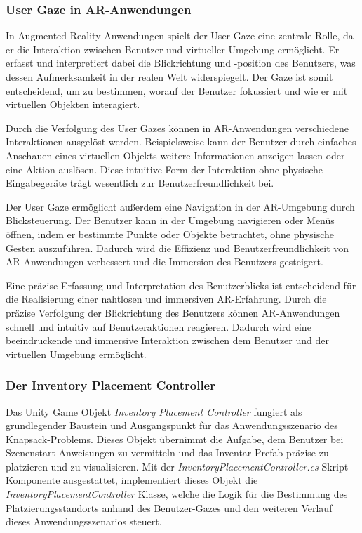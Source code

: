 \subsubsection{User Gaze in AR-Anwendungen}
In Augmented-Reality-Anwendungen spielt der User-Gaze eine zentrale Rolle, da er die Interaktion zwischen Benutzer und
virtueller Umgebung ermöglicht. Er erfasst und interpretiert dabei die Blickrichtung und -position des Benutzers, was dessen
Aufmerksamkeit in der realen Welt widerspiegelt. Der Gaze ist somit entscheidend, um zu bestimmen, worauf der Benutzer
fokussiert und wie er mit virtuellen Objekten interagiert.

Durch die Verfolgung des User Gazes können in AR-Anwendungen verschiedene Interaktionen ausgelöst werden. Beispielsweise
kann der Benutzer durch einfaches Anschauen eines virtuellen Objekts weitere Informationen anzeigen lassen oder eine Aktion
auslösen. Diese intuitive Form der Interaktion ohne physische Eingabegeräte trägt wesentlich zur Benutzerfreundlichkeit bei.

Der User Gaze ermöglicht außerdem eine Navigation in der AR-Umgebung durch Blicksteuerung. Der Benutzer kann in der Umgebung
navigieren oder Menüs öffnen, indem er bestimmte Punkte oder Objekte betrachtet, ohne physische Gesten auszuführen. Dadurch
wird die Effizienz und Benutzerfreundlichkeit von AR-Anwendungen verbessert und die Immersion des Benutzers gesteigert.

Eine präzise Erfassung und Interpretation des Benutzerblicks ist entscheidend für die Realisierung einer nahtlosen und
immersiven AR-Erfahrung. Durch die präzise Verfolgung der Blickrichtung des Benutzers können AR-Anwendungen schnell und
intuitiv auf Benutzeraktionen reagieren. Dadurch wird eine beeindruckende und immersive Interaktion zwischen dem Benutzer
und der virtuellen Umgebung ermöglicht.

\subsubsection{Der Inventory Placement Controller}
Das Unity Game Objekt \textit{Inventory Placement Controller} fungiert als grundlegender Baustein und Ausgangspunkt für
das Anwendungsszenario des Knapsack-Problems. Dieses Objekt übernimmt die Aufgabe, dem Benutzer bei Szenenstart Anweisungen
zu vermitteln und das Inventar-Prefab präzise zu platzieren und zu visualisieren. Mit der \textit{InventoryPlacementController.cs}
Skript-Komponente ausgestattet, implementiert dieses Objekt die \textit{InventoryPlacementController} Klasse, welche die
Logik für die Bestimmung des Platzierungsstandorts anhand des Benutzer-Gazes und den weiteren Verlauf dieses Anwendungsszenarios
steuert.

